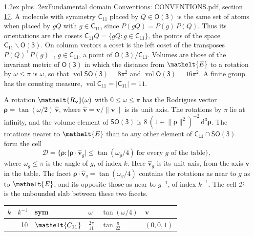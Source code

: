 \documentclass[10pt,a4paper]{article}
\makeatletter
\renewcommand\section{\@startsection{section}{1}{\z@}{-3ex plus -1ex minus -.2ex}%
  {1.2ex plus .2ex}{\normalfont\large\sffamily\bfseries\color{parttitle}}}
\numberwithin{equation}{section}
\newcommand{\eltfont}[1]{{\let\sigma\eltsigma\mathelt{#1}}}
\newcommand{\grp}[1]{\mathsf{#1}}
\newcommand{\cls}[1]{\eltfont{#1}}
\newcommand{\elt}[1]{\eltfont{#1}}
\newcommand{\dirvec}[3]{(#1, #2, #3)}
\newcommand{\unitaxis}{\hat{\mathbf{v}}}
\newcommand{\vv}{\mathbf{v}}
\newcommand{\diff}{\mathrm{d}}
\newcommand{\vol}{\operatorname{vol}}
\newcommand{\rodrigues}{\boldsymbol{\rho}}
\newcommand{\fcell}{\mathcal{D}}
\makeatother
\begin{document}
\section{Fundamental domain}\label{s:fundamental_domain}
Conventions: \href{../../CONVENTIONS.pdf}{CONVENTIONS.pdf}, section \href{../../CONVENTIONS.pdf\#conv.17}{17}.
\leavevmode\label{n:element.placement}A molecule with symmetry $\grp{C_{11}}$ placed by $Q \in \grp{O(3)}$ is the same set of atoms when placed by $gQ$ with $g \in \grp{C_{11}}$, since $P(gQ) = P(g)\,P(Q)$. \label{n:operator.cosets}Thus its orientations are the cosets $\grp{C_{11}}Q = \{gQ : g \in \grp{C_{11}}\}$, the points of the space $\grp{C_{11}}\backslash\grp{O(3)}$. On column vectors a coset is the left coset of the transposes $P(Q)^{\top}P(g)^{\top}$, $g \in \grp{C_{11}}$, a point of $\grp{O(3)}/\grp{C_{11}}$.
\leavevmode\label{n:operator.volume}Volumes are those of the invariant metric of \href{O3.pdf}{$\grp{O(3)}$} in which the distance from $\elt{E}$ to a rotation by $\omega \le \pi$ is $\omega$, so that $\vol\grp{SO(3)} = 8\pi^2$ and $\vol\grp{O(3)} = 16\pi^2$. A finite group has the counting measure, $\vol\grp{C_{11}} = |\grp{C_{11}}| = 11$.

\leavevmode\label{n:vector.rodrigues}\label{n:vector.unitaxis}A rotation $\elt{R_{\vv}}(\omega)$ with $0 \le \omega \le \pi$ has the Rodrigues vector $\rodrigues = \tan(\omega/2)\,\unitaxis$, where $\unitaxis = \vv/\lVert\vv\rVert$ is its unit axis. The rotations by $\pi$ lie at infinity, and the volume element of \href{SO3.pdf}{$\grp{SO(3)}$} is $8\,(1 + \lVert\rodrigues\rVert^2)^{-2}\,\diff^3\rodrigues$.
\leavevmode\label{n:set.cell}The rotations nearer to $\elt{E}$ than to any other element of $\grp{C_{11}} \cap \grp{SO(3)}$ form the cell
\begin{equation}\label{e:cell}\fcell = \bigl\{\rodrigues : \lvert\rodrigues\cdot\unitaxis_g\rvert \le \tan(\omega_g/4)\ \text{for every $g$ of the table}\bigr\},\end{equation}
where $\omega_g \le \pi$ is the angle of $g$, of index $k$. Here $\unitaxis_g$ is its unit axis, from the axis $\vv$ in the table. The facet $\rodrigues\cdot\unitaxis_g = \tan(\omega_g/4)$ contains the rotations as near to $g$ as to $\elt{E}$, and its opposite those as near to $g^{-1}$, of index $k^{-1}$. The cell $\fcell$ is the unbounded slab between these two facets.
{\small{\renewcommand{\arraystretch}{1.3}\begin{longtable}{@{}rrllll@{}}\toprule
$k$ & $k^{-1}$ & sym & $\omega$ & $\tan(\omega/4)$ & $\vv$\\\midrule\endhead
\bottomrule\endfoot\endlastfoot
1 & 10 & $\cls{C_{11}}$ & $\tfrac{2\pi}{11}$ & $\tan\tfrac{\pi}{22}$ & $\dirvec{0}{0}{1}$\\
\bottomrule\end{longtable}}}
\end{document}
